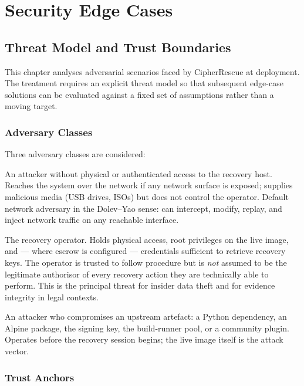 \documentclass[11pt,a4paper]{report}
\begin{document}
\chapter{Security Edge Cases}

\section{Threat Model and Trust Boundaries}
\label{sec:threatmodel}

This chapter analyses adversarial scenarios faced by CipherRescue at deployment. The treatment requires an explicit threat model so that subsequent edge-case solutions can be evaluated against a fixed set of assumptions rather than a moving target.

\subsection{Adversary Classes}

Three adversary classes are considered:

\begin{description}[noitemsep]
  \item[\textbf{A1 --- External attacker.}] An attacker without physical or authenticated access to the recovery host. Reaches the system over the network if any network surface is exposed; supplies malicious media (USB drives, ISOs) but does not control the operator. Default network adversary in the Dolev--Yao sense: can intercept, modify, replay, and inject network traffic on any reachable interface.
  \item[\textbf{A2 --- Partially-trusted operator.}] The recovery operator. Holds physical access, root privileges on the live image, and --- where escrow is configured --- credentials sufficient to retrieve recovery keys. The operator is trusted to follow procedure but is \emph{not} assumed to be the legitimate authorisor of every recovery action they are technically able to perform. This is the principal threat for insider data theft and for evidence integrity in legal contexts.
  \item[\textbf{A3 --- Supply-chain attacker.}] An attacker who compromises an upstream artefact: a Python dependency, an Alpine package, the signing key, the build-runner pool, or a community plugin. Operates before the recovery session begins; the live image itself is the attack vector.
\end{description}

\subsection{Trust Anchors}
\end{document}
